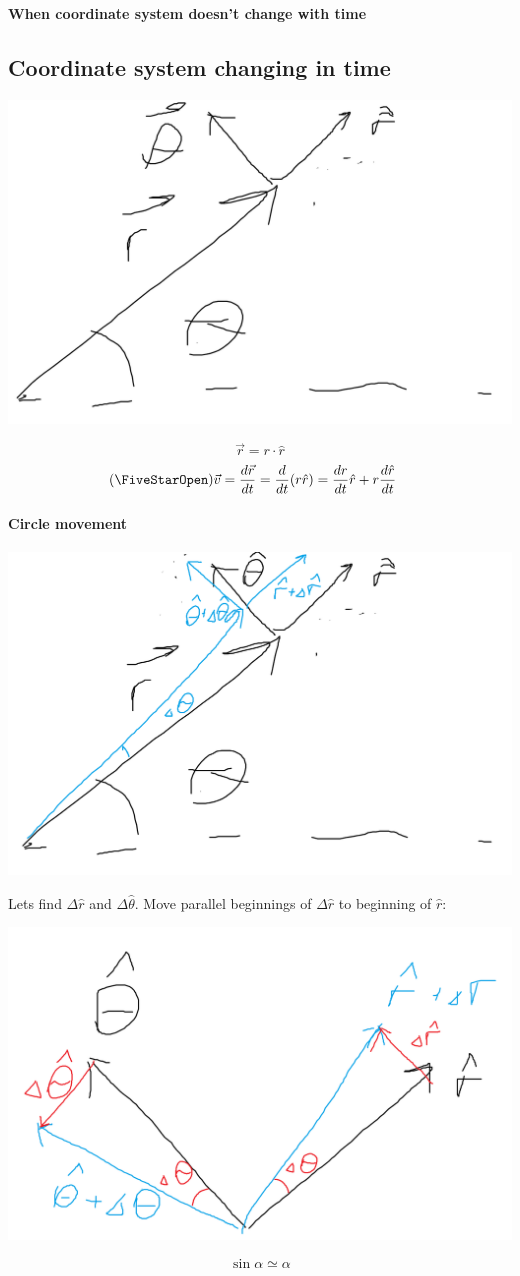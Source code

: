 \textbf{When coordinate system doesn't change with time}

\subsection{Coordinate system changing in time}

\begin{center}
	\includegraphics[width=0.25\linewidth]{./lect3/pic5.png}
\end{center}

$$\vec{r} = r \cdot \hat{r} $$
\begin{align*}
\left(\mbox{\FiveStarOpen}\right) &\vec{v} = \frac{d\vec{r}}{dt}= \frac{d}{dt} (r\hat{r}) = \frac{dr}{dt}\hat{r} + r \frac{d\hat{r}}{dt}
\end{align*}

\paragraph{Circle movement}

\begin{center}
	\includegraphics[width=0.4\linewidth]{./lect3/pic6.png}
\end{center}

Lets find $\Delta \hat{r}$ and $\Delta \hat{\theta}$. Move parallel beginnings of $\Delta \hat{r}$ to beginning of $\hat{r}$:

\begin{center}
	\includegraphics[width=0.4\linewidth]{./lect3/pic7.png}
\end{center}
$$\sin \alpha \simeq \alpha$$

